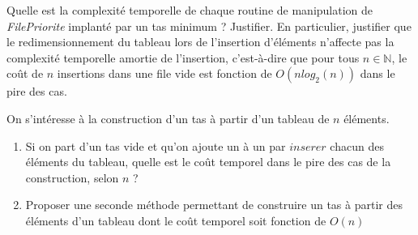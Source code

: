 \documentclass[../../../main.tex]{subfiles}
\begin{document}
 Quelle est la complexité temporelle de chaque routine de manipulation de \textit{FilePriorite} implanté par un tas minimum ? Justifier. En particulier, justifier que le redimensionnement du tableau lors de l'insertion d'éléments n'affecte pas la complexité temporelle amortie de l'insertion, c'est-à-dire que pour tous $n\in\mathbb{N}$, le coût de $n$ insertions dans une file vide est fonction de $O(nlog_2(n))$ dans le pire des cas.

 On s'intéresse à la construction d'un tas à partir d'un tableau de $n$ éléments.
\begin{enumerate}
	\item Si on part d'un tas vide et qu'on ajoute un à un par $inserer$ chacun des éléments du tableau, quelle est le coût temporel dans le pire des cas de la construction, selon $n$ ?
	\item Proposer une seconde méthode permettant de construire un tas à partir des éléments d'un tableau dont le coût temporel soit fonction de $O(n)$
\end{enumerate}

\end{document}
